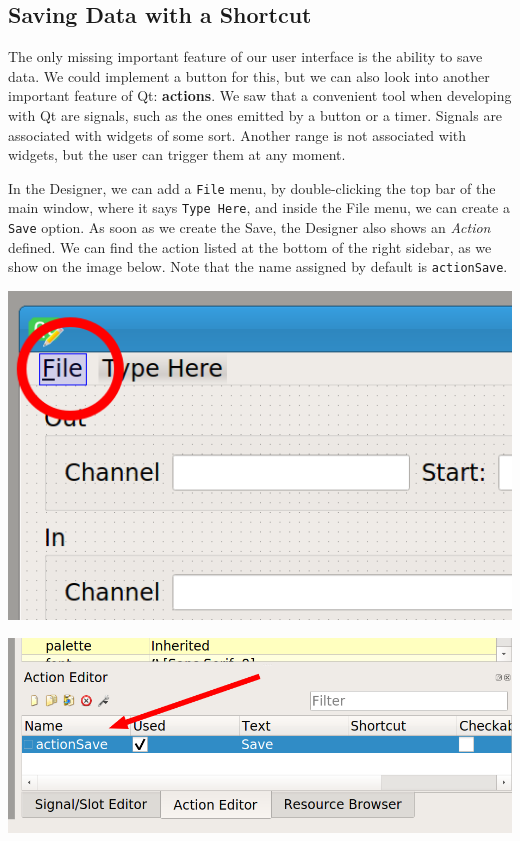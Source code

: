 \subsection{Saving Data with a Shortcut}\label{subsec:saving-data-with-a-shortcut}
The only missing important feature of our user interface is the ability to save data. We could implement a button for this, but we can also look into another important feature of Qt: \textbf{actions}. We saw that a convenient tool when developing with Qt are signals, such as the ones emitted by a button or a timer. Signals are associated with widgets of some sort. Another range is not associated with widgets, but the user can trigger them at any moment.

In the Designer, we can add a \texttt{File} menu, by double-clicking the top bar of the main window, where it says \texttt{Type Here}, and inside the File menu, we can create a \texttt{Save} option. As soon as we create the Save, the Designer also shows an \emph{Action} defined. We can find the action listed at the bottom of the right sidebar, as we show on the image below. Note that the name assigned by default is \texttt{actionSave}.

\begin{minipage}{0.45\linewidth}
    \centering
    \includegraphics[width=\textwidth]{images/Chapter_09/13_menu_file.png}
\end{minipage}
\hspace{0.5cm}
\begin{minipage}{0.45\linewidth}
    \centering
    \includegraphics[width=\textwidth]{images/Chapter_09/13_action_save.png}
\end{minipage}

